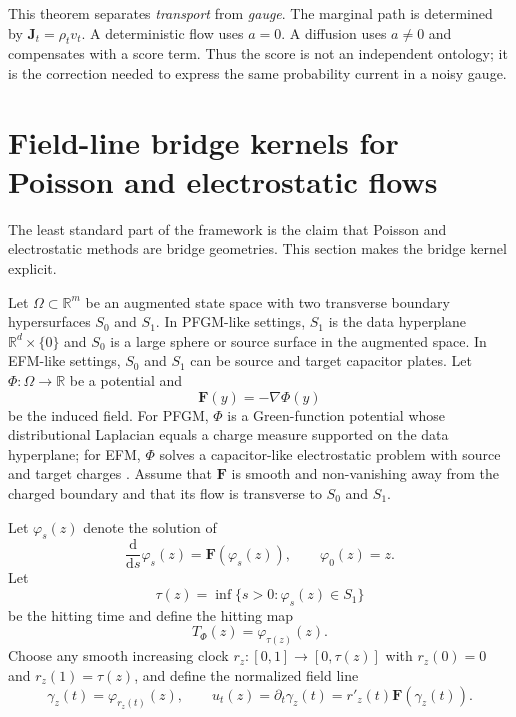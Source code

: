 \documentclass[twoside,11pt]{jmlr}
\numberwithin{equation}{section}
\newcommand{\R}{\mathbb{R}}
\newcommand{\dd}{\mathrm{d}}
\newcommand{\F}{\bm F}
\newcommand{\J}{\bm J}
\begin{document}
This theorem separates \emph{transport} from \emph{gauge}. The marginal path is determined by $\J_t=\rho_t v_t$. A deterministic flow uses $a=0$. A diffusion uses $a\neq0$ and compensates with a score term. Thus the score is not an independent ontology; it is the correction needed to express the same probability current in a noisy gauge.

\section{Field-line bridge kernels for Poisson and electrostatic flows}
\label{sec:field_bridges}

The least standard part of the framework is the claim that Poisson and electrostatic methods are bridge geometries. This section makes the bridge kernel explicit.

Let $\Omega\subset\R^m$ be an augmented state space with two transverse boundary hypersurfaces $S_0$ and $S_1$. In PFGM-like settings, $S_1$ is the data hyperplane $\R^d\times\{0\}$ and $S_0$ is a large sphere or source surface in the augmented space. In EFM-like settings, $S_0$ and $S_1$ can be source and target capacitor plates. Let $\Phi:\Omega\to\R$ be a potential and
\begin{equation}
    \F(y)=-\nabla\Phi(y)
\end{equation}
be the induced field. For PFGM, $\Phi$ is a Green-function potential whose distributional Laplacian equals a charge measure supported on the data hyperplane; for EFM, $\Phi$ solves a capacitor-like electrostatic problem with source and target charges \citep{xu2022pfgm,kolesov2025field}. Assume that $\F$ is smooth and non-vanishing away from the charged boundary and that its flow is transverse to $S_0$ and $S_1$.

Let $\varphi_s(z)$ denote the solution of
\begin{equation}
    \frac{\dd}{\dd s}\varphi_s(z)=\F(\varphi_s(z)),
    \qquad \varphi_0(z)=z.
    \label{eq:field_flow}
\end{equation}
Let
\begin{equation}
    \tau(z)=\inf\{s>0:\varphi_s(z)\in S_1\}
\end{equation}
be the hitting time and define the hitting map
\begin{equation}
    T_\Phi(z)=\varphi_{\tau(z)}(z).
    \label{eq:hitting_map}
\end{equation}
Choose any smooth increasing clock $r_z:[0,1]\to[0,\tau(z)]$ with $r_z(0)=0$ and $r_z(1)=\tau(z)$, and define the normalized field line
\begin{equation}
    \gamma_z(t)=\varphi_{r_z(t)}(z),
    \qquad
    u_t(z)=\partial_t\gamma_z(t)=r'_z(t)\F(\gamma_z(t)).
    \label{eq:normalized_field_line}
\end{equation}
\end{document}
